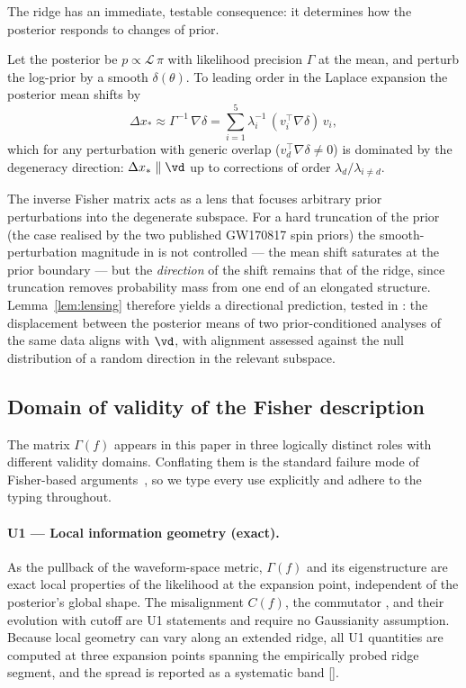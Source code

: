 The ridge has an immediate, testable consequence: it determines how the
posterior responds to changes of prior.

\begin{lemma}
\label{lem:lensing}
Let the posterior be $p \propto \mathcal{L}\,\pi$ with likelihood
precision $\Gamma$ at the mean, and perturb the log-prior by a smooth
$\delta(\theta)$. To leading order in the Laplace expansion the
posterior mean shifts by
\begin{equation}
\Delta x_{*} \approx \Gamma^{-1}\,\nabla\delta
= \sum_{i=1}^{5} \lambda_i^{-1}\,(v_i^{\top}\nabla\delta)\,v_i ,
\label{eq:lensing}
\end{equation}
which for any perturbation with generic overlap
($v_d^{\top}\nabla\delta \neq 0$) is dominated by the degeneracy
direction: $\Delta x_{*} \parallel \vd$ up to corrections of order
$\lambda_d/\lambda_{i\neq d}$.
\end{lemma}

The inverse Fisher matrix acts as a lens that focuses arbitrary prior
perturbations into the degenerate subspace. For a hard truncation of
the prior (the case realised by the two published GW170817 spin priors)
the smooth-perturbation magnitude in  is not
controlled --- the mean shift saturates at the prior boundary --- but
the \emph{direction} of the shift remains that of the ridge, since
truncation removes probability mass from one end of an elongated
structure. Lemma~\ref{lem:lensing} therefore yields a directional
prediction, tested in : the displacement between the
posterior means of two prior-conditioned analyses of the same data
aligns with $\vd$, with alignment assessed against the null
distribution of a random direction in the relevant subspace.

\subsection{Domain of validity of the Fisher description}
\label{sec:validity}

The matrix $\Gamma(f)$ appears in this paper in three logically
distinct roles with different validity domains. Conflating them is the
standard failure mode of Fisher-based
arguments~\cite{vallisneri2008fisher}, so we type every use explicitly
and adhere to the typing throughout.

\paragraph{U1 --- Local information geometry (exact).}
As the pullback of the waveform-space metric, $\Gamma(f)$ and its
eigenstructure are exact local properties of the likelihood at the
expansion point, independent of the posterior's global shape. The
misalignment $C(f)$, the commutator , and their
evolution with cutoff are U1 statements and require no Gaussianity
assumption. Because local geometry can vary along an extended ridge,
all U1 quantities are computed at three expansion points spanning the
empirically probed ridge segment, and the spread is reported as a
systematic band [].

